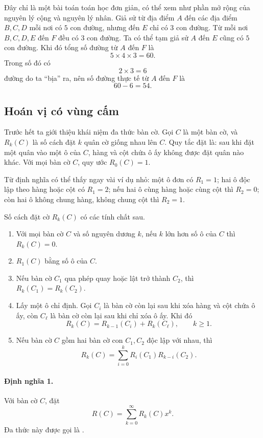 \documentclass[11pt]{article}
\begin{document}
Đây chỉ là một bài toán toán học đơn giản, có thể xem như phần mở rộng của
nguyên lý cộng và nguyên lý nhân. Giả sử từ địa điểm $A$ đến các địa điểm
$B,C,D$ mỗi nơi có $5$ con đường, nhưng đến $E$ chỉ có $3$ con đường. Từ mỗi
nơi $B,C,D,E$ đến $F$ đều có $3$ con đường. Ta có thể tạm giả sử $A$ đến $E$
cũng có $5$ con đường. Khi đó tổng số đường từ $A$ đến $F$ là
\[
  5\times 4\times 3=60.
\]
Trong số đó có
\[
  2\times 3=6
\]
đường do ta ``bịa'' ra, nên số đường thực tế từ $A$ đến $F$ là
\[
  60-6=54.
\]

\subsection{Hoán vị có vùng cấm}

Trước hết ta giới thiệu khái niệm đa thức bàn cờ. Gọi $C$ là một bàn cờ, và
$R_k(C)$ là số cách đặt $k$ quân cờ giống nhau lên $C$. Quy tắc đặt là: sau
khi đặt một quân vào một ô của $C$, hàng và cột chứa ô ấy không được đặt quân
nào khác. Với mọi bàn cờ $C$, quy ước $R_0(C)=1$.

Từ định nghĩa có thể thấy ngay vài ví dụ nhỏ: một ô đơn có $R_1=1$; hai ô độc
lập theo hàng hoặc cột có $R_1=2$; nếu hai ô cùng hàng hoặc cùng cột thì
$R_2=0$; còn hai ô không chung hàng, không chung cột thì $R_2=1$.

Số cách đặt cờ $R_k(C)$ có các tính chất sau.
\begin{enumerate}
  \item Với mọi bàn cờ $C$ và số nguyên dương $k$, nếu $k$ lớn hơn số ô của
  $C$ thì $R_k(C)=0$.
  \item $R_1(C)$ bằng số ô của $C$.
  \item Nếu bàn cờ $C_1$ qua phép quay hoặc lật trở thành $C_2$, thì
  $R_k(C_1)=R_k(C_2)$.
  \item Lấy một ô chỉ định. Gọi $C_i$ là bàn cờ còn lại sau khi xóa hàng và
  cột chứa ô ấy, còn $C_\ell$ là bàn cờ còn lại sau khi chỉ xóa ô ấy. Khi đó
  \[
    R_k(C)=R_{k-1}(C_i)+R_k(C_\ell),\qquad k\ge1.
  \]
  \item Nếu bàn cờ $C$ gồm hai bàn cờ con $C_1,C_2$ độc lập với nhau, thì
  \[
    R_k(C)=\sum_{i=0}^{k} R_i(C_1)R_{k-i}(C_2).
  \]
\end{enumerate}

\paragraph{Định nghĩa 1.}
Với bàn cờ $C$, đặt
\[
  R(C)=\sum_{k=0}^{\infty} R_k(C)x^k.
\]
Đa thức này được gọi là .
\end{document}
